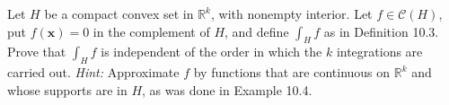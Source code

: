 \begin{exercise}
	Let $H$ be a compact convex set in $\mathbb{R}^k$, with nonempty interior. Let $f \in \mathscr{C} \left( H \right)$, put $f \left( \textbf{x} \right) = 0$ in the complement of $H$, and define $\int_H f$ as in Definition 10.3.
	\newline\newline
	Prove that $\int_H f$ is independent of the order in which the $k$ integrations are carried out. \textit{Hint:} Approximate $f$ by functions that are continuous on $\mathbb{R}^k$ and whose supports are in $H$, as was done in Example 10.4.
\end{exercise}
